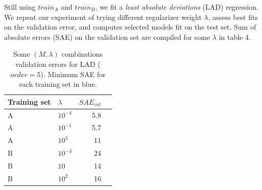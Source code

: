 \documentclass[twoside]{article}
\begin{document}
Still using $train_A$ and $train_B$, we fit a \textit{least absolute deviations} (LAD) regression. We repeat our experiment of trying different regularizer weight $\lambda$, assess best fits on the validation error, and computes selected models fit on the test set. Sum of absolute errors (SAE) on the validation set are compiled for some $\lambda$ in table 4.

\begin{table}[H]
\caption{Some $(M, \lambda)$ combinations validation errors for LAD ($order = 5$). Minimum SAE for each training set in blue.}
\centering
\begin{tabular}{llrr}
\toprule
Training set & $\lambda$ & $SAE_{val}$ \\
\midrule

A & $10^{-4}$ &  5.8\\
A & $10^{-1}$ & \textcolor{blue}{5.7}\\
A & $10^3$ & 11\\
B & $10^{-3}$ & 24\\
B & $10$ & \textcolor{blue}{14}\\
B & $10^2$ & 16\\
\bottomrule
\end{tabular}
\end{table}
\end{document}
